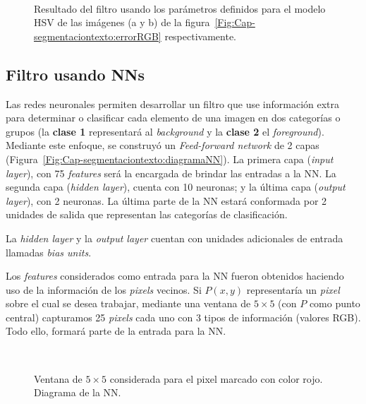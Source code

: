 \begin{figure}[h!]
	\centering
   { }
   \\
	\caption{Resultado del filtro usando los parámetros definidos para el modelo
	HSV de las imágenes (a y b) de la 
	figura~\ref{Fig:Cap-segmentaciontexto:errorRGB} respectivamente.}
	\label{Fig:Cap-segmentaciontexto:filtroAdHocHSV}
\end{figure}

\subsection{Filtro usando NNs}
Las redes neuronales permiten desarrollar un filtro que use información extra
para determinar o clasificar cada elemento de una imagen en dos categorías o
grupos (la \textbf{clase 1} representará al \textit{background} y la
\textbf{clase 2} el \textit{foreground}). Mediante este enfoque, se construyó un
\textit{Feed-forward network} de 2 capas
(Figura~\ref{Fig:Cap-segmentaciontexto:diagramaNN}). La primera capa
(\textit{input layer}), con 75 \textit{features} será la encargada de brindar
las entradas a la NN. La segunda capa (\textit{hidden layer}), cuenta con 10
neuronas; y la última capa (\textit{output layer}), con 2 neuronas. La última
parte de la NN estará conformada por 2 unidades de salida que representan las
categorías de clasificación.

La \textit{hidden layer} y la \textit{output layer} cuentan con unidades 
adicionales de entrada llamadas \textit{bias units}.

Los \textit{features} considerados como entrada para la NN fueron obtenidos 
haciendo uso de la información de los \textit{pixels} vecinos. Si $P(x,y)$
representaría un \textit{pixel} sobre el cual se desea trabajar, mediante una
ventana de $5 \times 5$ (con $P$ como punto central) capturamos 25
\textit{pixels} cada uno con 3 tipos de información (valores RGB). Todo ello,
formará parte de la entrada para la NN. 

\begin{figure}[h!]
	\centering
   { }
   \\
	\caption{Ventana de $5 \times 5$ considerada para el pixel marcado con color
	rojo. Diagrama de la NN.}
	\label{Fig:Cap-segmentaciontexto:input&diagramaNN}
\end{figure}

